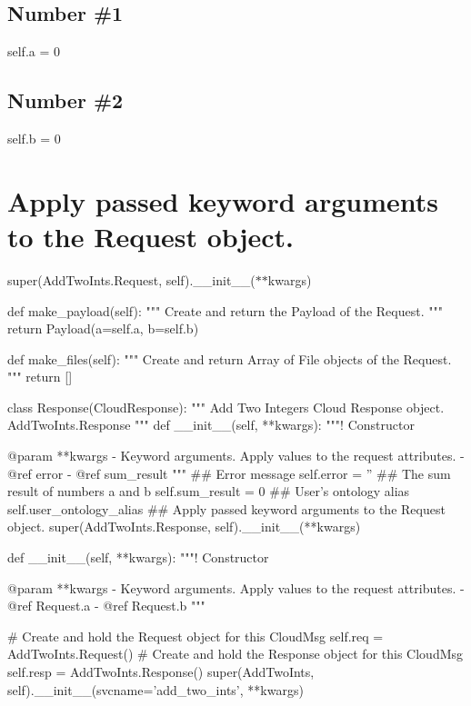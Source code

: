 \subsection*{Number \#1}

self.\-a = 0 \subsection*{Number \#2}

self.\-b = 0 \section*{Apply passed keyword arguments to the Request object.}

super(Add\-Two\-Ints.\-Request, self).\-\_\-\-\_\-init\-\_\-\-\_\-($\ast$$\ast$kwargs)

\begin{DoxyVerb}    def make_payload(self):
        """ Create and return the Payload of the Request. """
        return Payload(a=self.a, b=self.b)

    def make_files(self):
        """ Create and return Array of File objects of the Request. """
        return []

    class Response(CloudResponse):
        """ Add Two Integers Cloud Response object. AddTwoInts.Response """
        def __init__(self, **kwargs):
            """!
            Constructor

            @param **kwargs - Keyword arguments. Apply values to the request attributes.
            - @ref error
            - @ref sum_result
            """
            ## Error message
            self.error = ''
            ## The sum result of numbers a and b
            self.sum_result = 0
            ## User's ontology alias
            self.user_ontology_alias
            ## Apply passed keyword arguments to the Request object.
            super(AddTwoInts.Response, self).__init__(**kwargs)


    def __init__(self, **kwargs):
        """!
        Constructor

        @param **kwargs - Keyword arguments. Apply values to the request attributes.
            - @ref Request.a
            - @ref Request.b
        """

        # Create and hold the Request object for this CloudMsg
        self.req = AddTwoInts.Request()
        # Create and hold the Response object for this CloudMsg
        self.resp = AddTwoInts.Response()
        super(AddTwoInts, self).__init__(svcname='add_two_ints', **kwargs)
\end{DoxyVerb}



